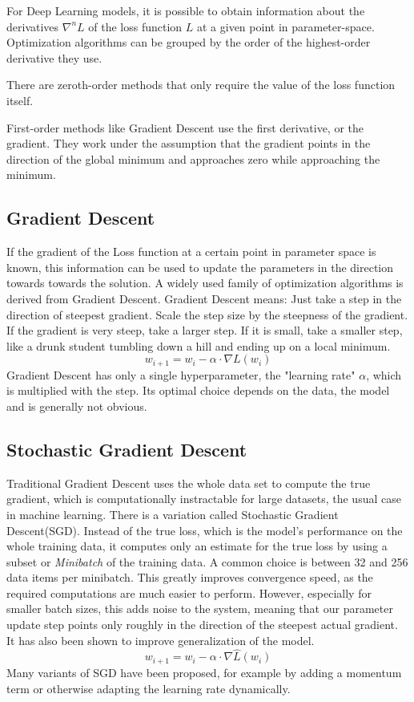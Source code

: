 \documentclass[twoside,12pt,a4paper]{report}
\begin{document}
For Deep Learning models, it is possible to obtain information about the derivatives $\nabla ^n L$ of the loss function $L$ at a given point in parameter-space. Optimization algorithms can be grouped by the order of the highest-order derivative they use.

There are zeroth-order methods that only require the value of the loss function itself.

First-order methods like Gradient Descent use the first derivative, or the gradient. They work under the assumption that the gradient points in the direction of the global minimum and approaches zero while approaching the minimum.

\subsection{Gradient Descent}
If the gradient of the Loss function at a certain point in parameter space is known, this information can be used to update the parameters in the direction towards towards the solution. A widely used family of optimization algorithms is derived from Gradient Descent. Gradient Descent means: Just take a step in the direction of steepest gradient. Scale the step size by the steepness of the gradient. If the gradient is very steep, take a larger step. If it is small, take a smaller step, like a drunk student tumbling down a hill and ending up on a local minimum.
$$w_{i+1} = w_i - \alpha \cdot \nabla L(w_i) $$
Gradient Descent has only a single hyperparameter, the "learning rate" $\alpha$, which is multiplied with the step. Its optimal choice depends on the data, the model and is generally not obvious.

\subsection{Stochastic Gradient Descent}
Traditional Gradient Descent uses the whole data set to compute the true gradient, which is computationally instractable for large datasets, the usual case in machine learning. There is a variation called Stochastic Gradient Descent(SGD). Instead of the true loss, which is the model's performance on the whole training data, it computes only an estimate for the true loss by using a subset or \textit{Minibatch} of the training data. A common choice is between 32 and 256 data items per minibatch.
This greatly improves convergence speed, as the required computations are much easier to perform. However, especially for smaller batch sizes, this adds noise to the system, meaning that our parameter update step points only roughly in the direction of the steepest actual gradient. It has also been shown to improve generalization of the model.
$$w_{i+1} = w_i - \alpha \cdot \nabla \hat{L}(w_i) $$
Many variants of SGD have been proposed, for example by adding a  momentum term or otherwise adapting the learning rate dynamically.
\end{document}

